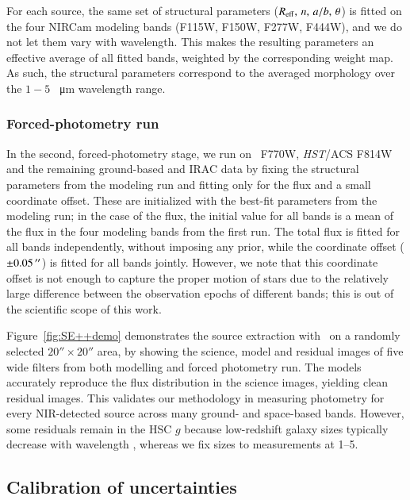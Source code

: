 \documentclass[longauth]{aa}
\begin{document}
For each source, the same set of structural parameters ($R_{\rm eff}, \, n, \, a/b, \, \theta$) is fitted on the four NIRCam modeling bands (F115W, F150W, F277W, F444W), and we do not let them vary with wavelength. This makes the resulting parameters an effective average of all fitted bands, weighted by the corresponding weight map. As such, the structural parameters correspond to the averaged morphology over the $1-5$ \SI{}{\micro \meter} wavelength range.






\subsubsection{Forced-photometry run} \label{sec:forced-photomerty}

In the second, forced-photometry stage, we run on \MIRI\ F770W, \textit{HST}/ACS F814W and the remaining ground-based and IRAC data by fixing the structural parameters from the modeling run and fitting only for the flux and a small coordinate offset. These are initialized with the best-fit parameters from the modeling run; in the case of the flux, the initial value for all bands is a mean of the flux in the four modeling bands from the first run. The total flux is fitted for all bands independently, without imposing any prior, while the coordinate offset ($\pm0.05 \, \SI{}{\ensuremath{^{\prime\prime}}}$) is fitted for all bands jointly. However, we note that this coordinate offset is not enough to capture the proper motion of stars due to the relatively large difference between the observation epochs of different bands; this is out of the scientific scope of this work.

Figure~\ref{fig:SE++demo} demonstrates the source extraction with \SEpp\ on a randomly selected $\ang{;;20} \times \ang{;;20}$ area, by showing the science, model and residual images of five wide filters from both modelling and forced photometry run. The models accurately reproduce the flux distribution in the science images, yielding clean residual images. This validates our methodology in measuring photometry for every NIR-detected source across many ground- and space-based bands. However, some residuals remain in the HSC $g$ because low-redshift galaxy sizes typically decrease with wavelength \citep[e.g.,][]{Vulcani2014}, whereas we fix sizes to measurements at \SIrange{1}{5}{\micron}.



\subsection{Calibration of uncertainties} \label{sec:uncertainty-calibration}
\end{document}
